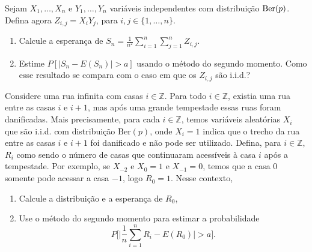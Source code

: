 \begin{exercise}
  Sejam $X_1, \dots, X_n$ e $Y_1, \dots, Y_n$ variáveis independentes com distribuição $\operatorname{Ber}(p)$.
  Defina agora $Z_{i,j} = X_i Y_j$, para $i, j \in \{1, \dots, n\}$.
  \begin{enumerate}[\quad a)]
  \item Calcule a esperança de $S_n = \tfrac{1}{n^2} \sum_{i=1}^n \sum_{j=1}^n Z_{i,j}$.
  \item Estime $P[|S_n - E(S_n)| > a]$ usando o método do segundo momento. Como esse resultado se compara com o caso em que os $Z_{i,j}$ são i.i.d.?
  \end{enumerate}
\end{exercise}

\begin{exercise}
  \label{x:casas_tempestade}
  Considere uma rua infinita com casas $i \in \mathbb{Z}$.
  Para todo $i \in \mathbb{Z}$, existia uma rua entre as casas $i$ e $i+1$, mas após uma grande tempestade essas ruas foram danificadas.
  Mais precisamente, para cada $i \in \mathbb{Z}$, temos variáveis aleatórias $X_i$ que são i.i.d. com distribuição $\text{Ber}(p)$, onde $X_i = 1$ indica que o trecho da rua entre as casas $i$ e $i + 1$ foi danificado e não pode ser utilizado.
  Defina, para $i \in \mathbb{Z}$, $R_i$ como sendo o número de casas que continuaram acessíveis à casa $i$ após a tempestade.
  Por exemplo, se $X_{-2}$ e $X_0 = 1$ e $X_{-1} = 0$, temos que a casa $0$ somente pode acessar a casa $-1$, logo $R_0 = 1$.
  Nesse contexto,
  \begin{enumerate}[\quad a)]
  \item Calcule a distribuição e a esperança de $R_0$,
  \item Use o método do segundo momento para estimar a probabilidade
    \begin{equation}
      P \Big[ \Big| \frac{1}{n} \sum_{i=1}^n R_i - E(R_0) \Big| > a \Big].
    \end{equation}
  \end{enumerate}
\end{exercise}





